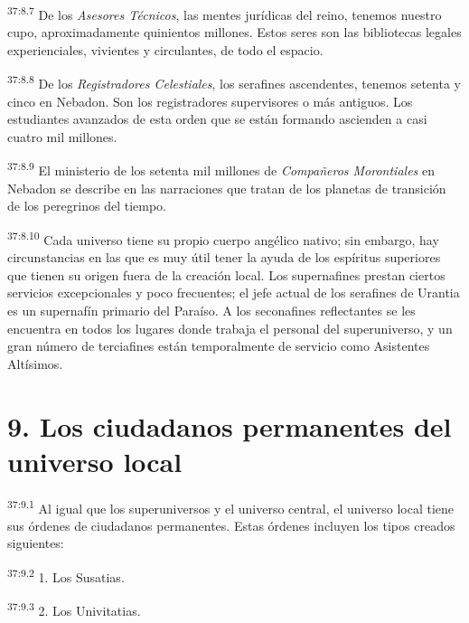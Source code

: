 \par
\textsuperscript{37:8.7} De los \textit{Asesores Técnicos}, las mentes jurídicas del reino, tenemos nuestro cupo, aproximadamente quinientos millones. Estos seres son las bibliotecas legales experienciales, vivientes y circulantes, de todo el espacio.

\par
\textsuperscript{37:8.8} De los \textit{Registradores Celestiales}, los serafines ascendentes, tenemos setenta y cinco en Nebadon. Son los registradores supervisores o más antiguos. Los estudiantes avanzados de esta orden que se están formando ascienden a casi cuatro mil millones.

\par
\textsuperscript{37:8.9} El ministerio de los setenta mil millones de \textit{Compañeros Morontiales} en Nebadon se describe en las narraciones que tratan de los planetas de transición de los peregrinos del tiempo.

\par
\textsuperscript{37:8.10} Cada universo tiene su propio cuerpo angélico nativo; sin embargo, hay circunstancias en las que es muy útil tener la ayuda de los espíritus superiores que tienen su origen fuera de la creación local. Los supernafines prestan ciertos servicios excepcionales y poco frecuentes; el jefe actual de los serafines de Urantia es un supernafín primario del Paraíso. A los seconafines reflectantes se les encuentra en todos los lugares donde trabaja el personal del superuniverso, y un gran número de terciafines están temporalmente de servicio como Asistentes Altísimos.

\section*{9. Los ciudadanos permanentes del universo local}
\par
\textsuperscript{37:9.1} Al igual que los superuniversos y el universo central, el universo local tiene sus órdenes de ciudadanos permanentes. Estas órdenes incluyen los tipos creados siguientes:

\par
\textsuperscript{37:9.2} 1. Los Susatias.

\par
\textsuperscript{37:9.3} 2. Los Univitatias.

